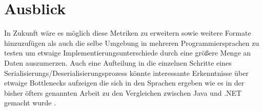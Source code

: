\documentclass[ngerman]{seminarvorlage}
\begin{document}
\section{Ausblick}

In Zukunft wäre es möglich diese Metriken zu erweitern sowie weitere Formate hinzuzufügen als auch die selbe Umgebung in mehreren Programmiersprachen zu testen um etwaige Implementierungsunterschiede durch eine größere Menge an Daten auszumerzen. Auch eine Aufteilung in die einzelnen Schritte eines Serialisierungs/Deserialisierungsprozess könnte interessante Erkenntnisse über etwaige Bottlenecks aufzeigen die sich in den Sprachen ergeben wie es in der bisher öfters genannten Arbeit zu den Vergleichen zwischen Java und .NET gemacht wurde \cite{10.1145/944579.944589}. 

%
%


\newpage 

\end{document}
